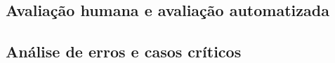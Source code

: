\subsection{Avaliação humana e avaliação automatizada}


\subsection{Análise de erros e casos críticos}

